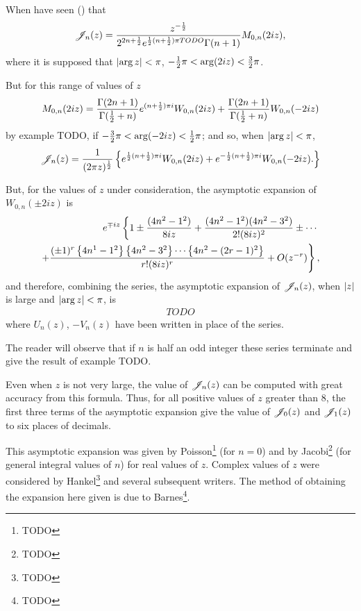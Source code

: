 When have seen () that
$$
\mathscr{J}_{n}(z)
=
\frac{z^{-\frac{1}{2}}}{2^{2n+\frac{1}{2}} e^{\frac{1}{2}(n+\frac{1}{2})\pi TODO} \Gamma(n+1)}
M_{0,n}(2iz),
$$
where it is supposed that 
$\left|  \arg z  \right| < \pi$,
$-\frac{1}{2}\pi < \arg (2iz) < \frac{3}{2} \pi$.

But for this range of values of $z$
$$
M_{0,n}(2iz)
=
\frac{\Gamma(2n+1)}{\Gamma(\frac{1}{2} + n)}
e^{(n+\frac{1}{2})\pi i}
W_{0,n}(2iz)
+
\frac{\Gamma(2n+1)}{\Gamma(\frac{1}{2}+n)}
W_{0,n}(-2iz)
$$
by  example TODO,
if
$-\frac{3}{2} \pi < \arg (-2iz) < \frac{1}{2} \pi$; and so, when
$\left| \arg z \right| < \pi$,
$$
\mathscr{J}_{n}(z)
=
\frac{1}{(2\pi z)^{\frac{1}{2}}}
\left\{ 
  e^{\frac{1}{2} (n+\frac{1}{2})\pi i} W_{0,n}(2iz)
  +
  e^{-\frac{1}{2} (n+\frac{1}{2})\pi i} W_{0,n}(-2iz).
 \right\}
$$

But, for the values of $z$ under consideration, the asymptotic
expansion of $W_{0,n}(\pm 2 i z)$ is
\begin{align*}
  e^{\mp i z}
  \left\{
    1
    \pm \frac{(4n^{2} - 1^{2})}{8iz}
    + \frac{ (4n^{2}-1^{2})(4n^{2}-3^{2})}{2! (8iz)^{2}}
    \pm \cdots
  \right.
  \\
  \left.
    + \frac{ (\pm 1)^{r} \left\{ 4n^{1}-1^{2} \right\} \left\{ 4n^{2}-3^{2} \right\} \cdots
      \left\{ 4n^{2} - (2r-1)^{2} \right\}  }{r! (8iz)^{r}}
    + O(z^{-r})
  \right\},
\end{align*}
and therefore, combining the series, the asymptotic expansion of
$\mathscr{J}_{n}(z)$, when $\left| z \right|$ is large and $\left| \arg z \right| < \pi$, is
\begin{align*}
  TODO
\end{align*}
where $U_{n}(z)$, $-V_{n}(z)$ have been written in place of the series.

The reader will observe that if $n$ is half an odd integer these
series terminate and give the result of 
example TODO.

% 
% 
Even when $z$ is not very large, the value of $\mathscr{J}_{n}(z)$ can be
computed with great accuracy from this formula. Thus, for all
positive values of $z$ greater than $8$, the first three terms of
the asymptotic expansion give the value of $\mathscr{J}_{0}(z)$ and $\mathscr{J}_{1}(z)$ to
six places of decimals.

This asymptotic expansion was given by Poisson\footnote{TODO} (for
$n=0$) and by Jacobi\footnote{TODO} (for general integral values of
$n$) for real values of $z$.
Complex values of $z$ were considered by Hankel\footnote{TODO} and
several subsequent writers. The method of obtaining the expansion
here given is due to Barnes\footnote{TODO}.

